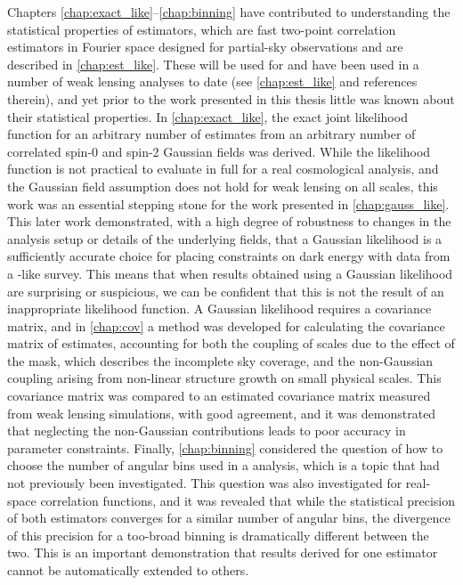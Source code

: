 Chapters \ref{chap:exact_like}--\ref{chap:binning} have contributed to understanding the statistical properties of \pcl{} estimators, which are fast two-point correlation estimators in Fourier space designed for partial-sky observations and are described in \autoref{chap:est_like}. These will be used for \Euclid{} and have been used in a number of weak lensing analyses to date (see \autoref{chap:est_like} and references therein), and yet prior to the work presented in this thesis little was known about their statistical properties. In \autoref{chap:exact_like}, the exact joint likelihood function for an arbitrary number of \pcl{} estimates from an arbitrary number of correlated spin-0 and spin-2 Gaussian fields was derived. While the likelihood function is not practical to evaluate in full for a real cosmological analysis, and the Gaussian field assumption does not hold for weak lensing on all scales, this work was an essential stepping stone for the work presented in \autoref{chap:gauss_like}. This later work demonstrated, with a high degree of robustness to changes in the analysis setup or details of the underlying fields, that a Gaussian likelihood is a sufficiently accurate choice for placing constraints on dark energy with data from a \Euclid{}-like survey. This means that when results obtained using a Gaussian likelihood are surprising or suspicious, we can be confident that this is not the result of an inappropriate likelihood function. A Gaussian likelihood requires a covariance matrix, and in \autoref{chap:cov} a method was developed for calculating the covariance matrix of \pcl{} estimates, accounting for both the coupling of scales due to the effect of the mask, which describes the incomplete sky coverage, and the non-Gaussian coupling arising from non-linear structure growth on small physical scales. This covariance matrix was compared to an estimated covariance matrix measured from weak lensing simulations, with good agreement, and it was demonstrated that neglecting the non-Gaussian contributions leads to poor accuracy in parameter constraints. Finally, \autoref{chap:binning} considered the question of how to choose the number of angular bins used in a \pcl{} analysis, which is a topic that had not previously been investigated. This question was also investigated for real-space correlation functions, and it was revealed that while the statistical precision of both estimators converges for a similar number of angular bins, the divergence of this precision for a too-broad binning is dramatically different between the two. This is an important demonstration that results derived for one estimator cannot be automatically extended to others.

